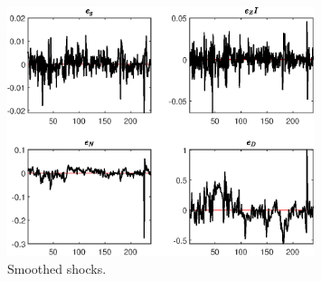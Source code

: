  
\begin{figure}[H]
\centering 
\includegraphics[width=0.80\textwidth]{BRS_growth_alt/graphs/BRS_growth_alt_SmoothedShocks1}
\caption{Smoothed shocks.}\label{Fig:SmoothedShocks:1}
\end{figure}



